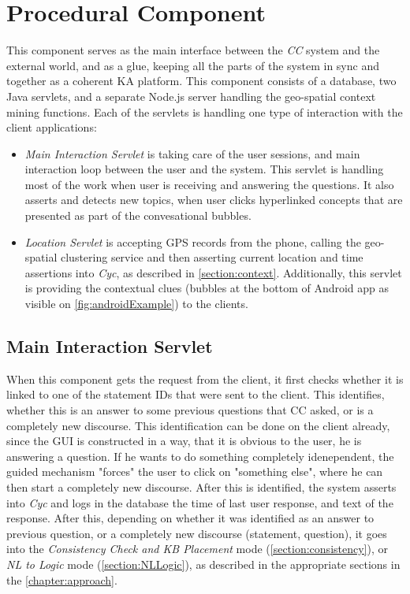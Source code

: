 \section{Procedural Component}
\label{section:prophet}
This component serves as the main interface between the \emph{CC} system and
the external world, and as a glue, keeping all the parts of the system in sync
and together as a coherent KA platform. This component consists of a database,
two Java servlets, and a separate Node.js server handling the geo-spatial 
context mining functions. Each of the servlets is handling one type of 
interaction with the client applications:
\begin{itemize}
\item \emph{Main Interaction Servlet} is taking care of the user sessions, and 
main interaction loop between the user and the system. This servlet is handling
most of the work when user is receiving and answering the questions. It also
asserts and detects new topics, when user clicks hyperlinked concepts that
are presented as part of the convesational bubbles.
\item \emph{Location Servlet} is accepting GPS records from the phone, calling
the geo-spatial clustering service and then asserting current location and 
time assertions into \emph{Cyc}, as described in \autoref{section:context}.
Additionally, this servlet is providing the contextual clues (bubbles at the
bottom of Android app as visible on \autoref{fig:androidExample}) to the 
clients.
\end{itemize}

\subsection{Main Interaction Servlet}
\label{section:mainServlet}
When this component gets the request from the client, it first checks whether
it is linked to one of the statement IDs that were sent to the client. This
identifies, whether this is an answer to some previous questions that CC
asked, or is a completely new discourse. This identification can be done on 
the client already, since the GUI is constructed in a way, that it is obvious
to the user, he is answering a question. If he wants to do something completely
idenependent, the guided mechanism "forces" the user to click on 
"something else", where he can then start a completely new discourse.
After this is identified, the system asserts into  \emph{Cyc} and logs
in the database  the time of last user response, and text of the
response. After this, depending on whether it was identified as an answer to
previous question, or a completely new discourse (statement, question), it goes
into the \emph{Consistency Check and KB Placement} mode 
(\autoref{section:consistency}), or \emph{NL to Logic} mode 
(\autoref{section:NLLogic}), as described in the appropriate sections in the 
\autoref{chapter:approach}. 

